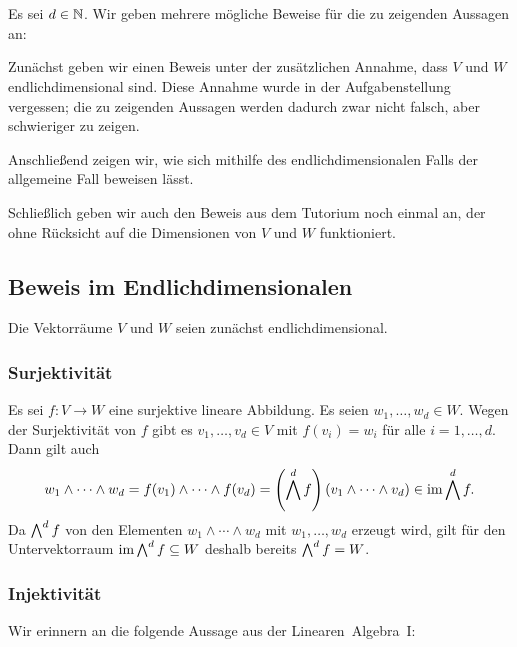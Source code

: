 \section{}
Es sei $d \in \mathbb{N}$.
Wir geben mehrere mögliche Beweise für die zu zeigenden Aussagen an:

Zunächst geben wir einen Beweis unter der zusätzlichen Annahme, dass $V$ und $W$ endlichdimensional sind.
Diese Annahme wurde in der Aufgabenstellung vergessen;
die zu zeigenden Aussagen werden dadurch zwar nicht falsch, aber schwieriger zu zeigen.

Anschließend zeigen wir, wie sich mithilfe des endlichdimensionalen Falls der allgemeine Fall beweisen lässt.

Schließlich geben wir auch den Beweis aus dem Tutorium noch einmal an, der ohne Rücksicht auf die Dimensionen von $V$ und $W$ funktioniert.





\subsection{Beweis im Endlichdimensionalen}

Die Vektorräume $V$ und $W$ seien zunächst endlichdimensional.



\subsubsection{Surjektivität}

Es sei $f \colon V \to W$ eine surjektive lineare Abbildung.
Es seien $w_1, \dotsc, w_d \in W$.
Wegen der Surjektivität von $f$ gibt es $v_1, \dotsc, v_d \in V$ mit $f(v_i) = w_i$ für alle $i = 1, \dotsc, d$.
Dann gilt auch
\[
      w_1 \wedge \dotsb \wedge w_d
  =   f(v_1) \wedge \dotsb \wedge f(v_d)
  =   \left( \bigwedge^{d} f \right)(v_1 \wedge \dotsb \wedge v_d)
  \in \operatorname{im} \bigwedge^{d} f.
\]
Da $\bigwedge^{d} f$ von den Elementen $w_1 \wedge \dotsb \wedge w_d$ mit $w_1, \dotsc, w_d$ erzeugt wird, gilt für den Untervektorraum $\operatorname{im} \bigwedge^{d} f \subseteq W$ deshalb bereits $\bigwedge^{d} f = W$.



\subsubsection{Injektivität}

Wir erinnern an die folgende Aussage aus der Linearen~Algebra~I:

